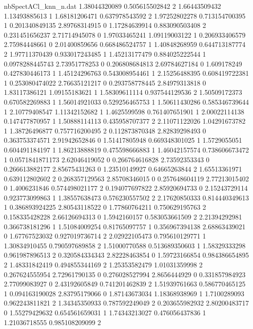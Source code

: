 \begin{filecontents}{nbSpectACl_knn_n.dat}
1.38044320089 0.505615502842 2
1.66443509432 1.13493885613 1
1.68181206471 0.637978543592 2
1.97252802278 0.713154700395 1
0.201340849135 2.89768314915 0
1.17284639914 0.883090503408 2
0.231451656237 2.71714945078 0
1.97033465241 1.09119003122 1
0.206933406579 2.75984448661 0
2.01400859656 0.668486524757 1
1.40848268959 0.644713187774 2
1.97711370439 0.933017243485 1
1.45213177479 0.884025222544 1
0.0978288445743 2.73951778253 0
0.206808684813 2.69784627184 0
1.609178249 0.427830446173 1
1.45124296763 0.543008954461 1
2.15256488395 0.608419722381 1
0.253080474022 2.76635121217 0
0.293758778445 2.84979313818 0
1.83117386121 1.09155183621 1
1.58309611114 0.937544129536 2
1.50509172373 0.670582269883 1
1.56014921033 0.529256465753 1
1.50611430286 0.585346739644 1
2.10779408547 1.11342152682 1
1.4625599598 0.761407651901 1
2.00022114138 0.147477870957 1
1.50888114113 0.435958707377 2
2.11071122026 1.04291673782 1
1.38726496877 0.757716200495 2
0.112873870348 2.82839298493 0
0.363753374571 2.91942652846 0
1.51417805948 0.669348301025 1
1.5729055051 0.604491184197 1
1.86213888819 0.475598666883 1
1.46042157574 0.738606673472 1
0.0571841871173 2.62046419052 0
0.266764616828 2.73592353343 0
0.266613882177 2.85675431263 0
1.23510149927 0.64665263844 2
1.65513361971 0.639112802602 2
0.268357129563 2.85708346015 0
0.257648604119 2.77213015402 0
1.4006231846 0.574498021177 2
0.194077697822 2.85920694733 0
2.15243729114 0.923773099863 1
1.38557638473 0.576230557502 2
2.17620850333 0.814440349613 1
0.386893924225 2.80543118522 0
1.77860764211 0.750629195763 2
0.158335428228 2.66126694313 0
1.5942160157 0.583053661509 2
2.21394292981 0.366738181296 1
1.51084009254 0.81765097757 1
0.356967394138 2.68863439021 0
1.67767523032 0.927019736714 2
2.02922105473 0.795610129771 1
1.30834910455 0.790597689858 2
1.51000770588 0.513689350603 1
1.58329333298 0.961987896513 2
0.320584334343 2.82228463854 0
1.59723166854 0.984386654895 2
1.48331842419 0.494855344169 2
1.25353582479 1.01031359998 2
0.267624555954 2.72961790135 0
0.276028527994 2.8656444929 0
0.331857984923 2.77099083927 0
2.43192605849 0.741201462839 2
1.51939761663 0.586770465125 1
0.094163190028 2.83795179066 0
1.87143673034 1.18368938969 1
1.7100289093 0.962243811821 2
1.34345350933 0.787592249049 2
0.203655982932 2.80200483717 0
1.55279429632 0.654561659031 1
1.74343213027 0.476056437836 1
1.21036718555 0.985108209099 2
\end{filecontents}
